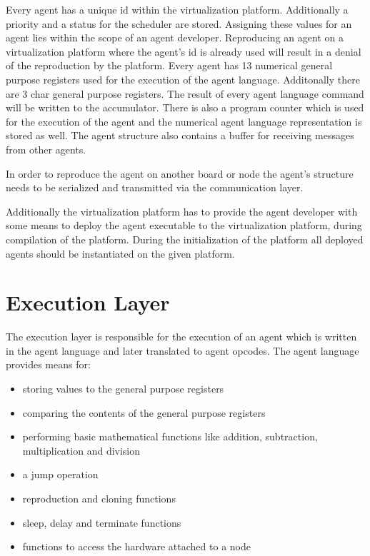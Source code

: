 \documentclass{scrreprt}
\begin{document}
Every agent has a unique id within the virtualization platform. Additionally a priority and a status for the
scheduler are stored. Assigning these values for an agent lies within the scope of an agent developer. 
Reproducing an agent on a virtualization platform where the agent’s id is already used will result in a denial 
of the reproduction by the platform. Every agent has 13 numerical general purpose registers used for the execution
of the agent language. Additonally there are 3 char general purpose registers. The result of every agent language 
command will be written to the accumulator. There is also a program counter which is used for the execution of the
agent and the numerical agent language representation is stored as well. The agent structure also contains a buffer
for receiving messages from other agents.


\noindent
In order to reproduce the agent on another board or node the agent’s structure needs to be serialized and transmitted via the communication layer.


\noindent
Additionally the virtualization platform has to provide the agent developer with some means to deploy the agent
executable to the virtualization platform, during compilation of the platform. During the initialization of the
platform all deployed agents should be instantiated on the given platform.

\section{Execution Layer}

The execution layer is responsible for the execution of an agent which is written in the agent language and later translated to agent opcodes. 
The agent language provides means for:
\begin{itemize}
 \item storing values to the general purpose registers
 \item comparing the contents of the general purpose registers 
 \item performing basic mathematical functions like addition, subtraction, multiplication and division
 \item a jump operation 
 \item reproduction and cloning functions
 \item sleep, delay and terminate functions
 \item functions to access the hardware attached to a node
\end{itemize}
\end{document}
